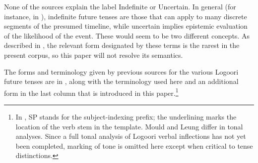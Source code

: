 \documentclass[output=paper]{langsci/langscibook}
\begin{document}
None of the sources explain the label Indefinite or Uncertain. In general (for instance, in \citealt[20]{Johnson1977}), indefinite %
%
%
%
%
future tenses are those that can apply to many discrete segments of the presumed timeline, while uncertain implies epistemic evaluation of the likelihood of the event. These would seem to be two different concepts. As described in , the relevant form designated by these terms is the rarest in the present corpus, so this paper will not resolve its semantics.

The forms and terminology given by previous sources for the various Logoori future tenses are in , along with the terminology used here and an additional form in the last column that is introduced in this paper.\footnote{ In , SP stands for the subject-indexing prefix; the underlining marks the location of the verb stem in the template. Mould and Leung differ in tonal analyses. Since a full tonal analysis of Logoori verbal inflections has not yet been completed, marking of tone is omitted here except when critical to tense distinctions. } 
\end{document}
